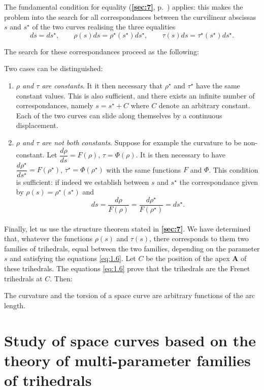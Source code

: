 \documentclass[leqno,11pt]{book}
\numberwithin{equation}{chapter}
\theoremstyle{shape1}
\theoremstyle{shapesmall}
\newcommand{\fsref}[1]{{\rm\textsection\textbf{\ref{sec:#1}}}}
\newcommand{\str}{^{\star}}
\begin{document}
The fundamental condition for equality (\fsref{7}, p.~\pageref{sec:7}) applies: this makes the problem into the search for all correspondances between the curvilinear abscissas $s$ and $s^{\star}$ of the two curves realising the three equalities
\[
ds=ds^{\star},\qquad\rho(s)ds=\rho^{\star}(s^{\star})ds^{\star},\qquad\tau(s)ds=\tau^{\star}(s^{\star})ds^{\star}.
\]

The search for these correspondances proceed as the following:

Two cases can be distinguished:
\begin{enumerate}
\item \emph{$\rho$ and $\tau$ are constants}. It it then necessary that $\rho^{\star}$ and $\tau^{\star}$ have the same constant values. This is also sufficient, and there exists an infinite number of correspondances, namely $s=s^{\star}+C$ where $C$ denote an arbitrary constant. Each of the two curves can slide along themselves by a continuous displacement.
\item \emph{$\rho$ and $\tau$ are not both constants}. Suppose for example the curvature to be non-constant. Let $\dfrac{d\rho}{ds}=F(\rho)$, $\tau=\Phi(\rho)$. It is then necessary to have $\dfrac{d\rho^{\star}}{ds^{\star}}=F(\rho^{\star})$, $\tau^{\star}=\Phi(\rho^{\star})$ with the same functions $F$ and $\Phi$. This condition is sufficient: if indeed we establish between $s$ and $s^{\star}$ the correspondance given by $\rho(s)=\rho\str(s\str)$ and
\[
ds=\frac{d\rho}{F(\rho)}=\frac{d\rho\str}{F(\rho\str)}=ds\str.
\]
\end{enumerate}

\paragraph{}
\label{sec:14}
Finally, let us use the structure theorem stated in \fsref{7}. We have determined that, whatever the functions $\rho(s)$ and $\tau(s)$, there corresponds to them two families of trihedrals, equal between the two families, depending on the parameter $s$ and satisfying the equations \eqref{eq:1.6}. Let $C$ be the position of the apex $\mathbf{A}$ of these trihedrals. The equations \eqref{eq:1.6} prove that the trihedrals are the Frenet trihedrals at $C$. Then:
\begin{strthm}
  The curvature and the torsion of a space curve are arbitrary functions of the arc length.
\end{strthm}


\section{Study of space curves based on the theory of multi-parameter families of trihedrals}
\label{sec:study-space-curves}
\end{document}
